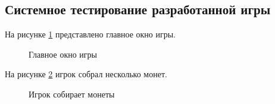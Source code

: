 \subsection{Системное тестирование разработанной игры}

На рисунке \ref{main:image} представлено главное окно игры.
\newpage %
\begin{figure}[H] %
\caption{Главное окно игры}
\label{main:image}
\end{figure}

На рисунке \ref{menu:image} игрок собрал несколько монет.

\begin{figure}[ht]
\caption{Игрок собирает монеты}
\label{menu:image}
\end{figure}

